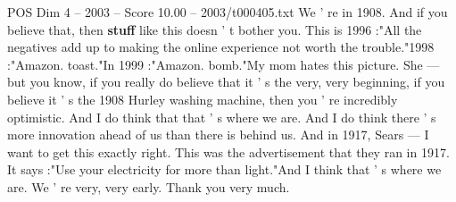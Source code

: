 \begin{textsample}{POS Dim 4 – 2003 – Score 10.00 – 2003/t000405.txt}
We ' re in 1908.
And if you believe that, then \textbf{stuff} like this doesn ' t bother you.
This is 1996 :"All the negatives add up to making the online experience not worth the trouble."1998 :"Amazon. toast."In 1999 :"Amazon. bomb."My mom hates this picture.
She — but you know, if you really do believe that it ' s the very, very beginning, if you believe it ' s the 1908 Hurley washing machine, then you ' re incredibly optimistic.
And I do think that that ' s where we are.
And I do think there ' s more innovation ahead of us than there is behind us.
And in 1917, Sears — I want to get this exactly right.
This was the advertisement that they ran in 1917.
It says :"Use your electricity for more than light."And I think that ' s where we are.
We ' re very, very early.
Thank you very much.

\end{textsample}
